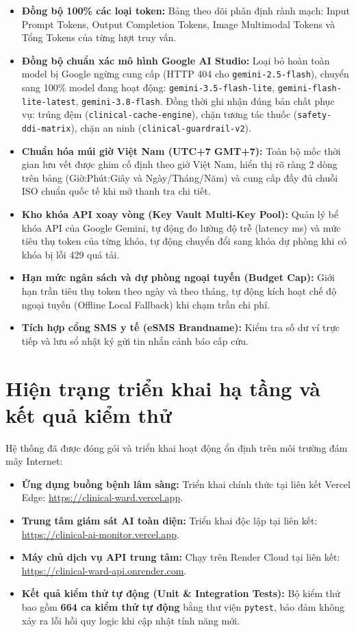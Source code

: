\documentclass[12pt,a4paper]{article}
\begin{document}
\begin{itemize}[leftmargin=1.5em]
    \item \textbf{Đồng bộ 100\% các loại token:} Bảng theo dõi phân định rành mạch: Input Prompt Tokens, Output Completion Tokens, Image Multimodal Tokens và Tổng Tokens của từng lượt truy vấn.
    \item \textbf{Đồng bộ chuẩn xác mô hình Google AI Studio:} Loại bỏ hoàn toàn model bị Google ngừng cung cấp (HTTP 404 cho \texttt{gemini-2.5-flash}), chuyển sang 100\% model đang hoạt động: \texttt{gemini-3.5-flash-lite}, \texttt{gemini-flash-lite-latest}, \texttt{gemini-3.8-flash}. Đồng thời ghi nhận đúng bản chất phục vụ: trúng đệm (\texttt{clinical-cache-engine}), chặn tương tác thuốc (\texttt{safety-ddi-matrix}), chặn an ninh (\texttt{clinical-guardrail-v2}).
    \item \textbf{Chuẩn hóa múi giờ Việt Nam (UTC+7 GMT+7):} Toàn bộ mốc thời gian lưu vết được ghim cố định theo giờ Việt Nam, hiển thị rõ ràng 2 dòng trên bảng (Giờ:Phút:Giây và Ngày/Tháng/Năm) và cung cấp đầy đủ chuỗi ISO chuẩn quốc tế khi mở thanh tra chi tiết.
    \item \textbf{Kho khóa API xoay vòng (Key Vault Multi-Key Pool):} Quản lý bể khóa API của Google Gemini, tự động đo lường độ trễ (latency ms) và mức tiêu thụ token của từng khóa, tự động chuyển đổi sang khóa dự phòng khi có khóa bị lỗi 429 quá tải.
    \item \textbf{Hạn mức ngân sách và dự phòng ngoại tuyến (Budget Cap):} Giới hạn trần tiêu thụ token theo ngày và theo tháng, tự động kích hoạt chế độ ngoại tuyến (Offline Local Fallback) khi chạm trần chi phí.
    \item \textbf{Tích hợp cổng SMS y tế (eSMS Brandname):} Kiểm tra số dư ví trực tiếp và lưu sổ nhật ký gửi tin nhắn cảnh báo cấp cứu.
\end{itemize}

\section{Hiện trạng triển khai hạ tầng và kết quả kiểm thử}

Hệ thống đã được đóng gói và triển khai hoạt động ổn định trên môi trường đám mây Internet:

\begin{itemize}[leftmargin=1.5em]
    \item \textbf{Ứng dụng buồng bệnh lâm sàng:} Triển khai chính thức tại liên kết Vercel Edge: \url{https://clinical-ward.vercel.app}.
    \item \textbf{Trung tâm giám sát AI toàn diện:} Triển khai độc lập tại liên kết: \url{https://clinical-ai-monitor.vercel.app}.
    \item \textbf{Máy chủ dịch vụ API trung tâm:} Chạy trên Render Cloud tại liên kết: \url{https://clinical-ward-api.onrender.com}.
    \item \textbf{Kết quả kiểm thử tự động (Unit \& Integration Tests):} Bộ kiểm thử bao gồm \textbf{664 ca kiểm thử tự động} bằng thư viện \texttt{pytest}, bảo đảm không xảy ra lỗi hồi quy logic khi cập nhật tính năng mới.
\end{itemize}
\end{document}
